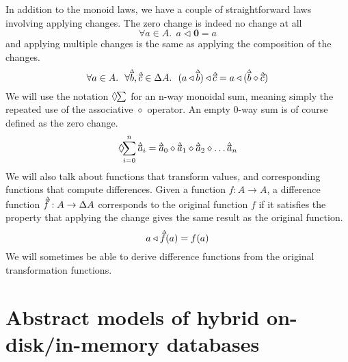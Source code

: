 \documentclass[11pt,a4paper]{article}
\newcommand\deltavar[1]{\accentset{\Delta}{#1}}
\begin{document}
In addition to the monoid laws, we have a couple of straightforward laws involving
applying changes. The zero change is indeed no change at all
\begin{equation}
  \forall a \in A. ~~ a \triangleleft \mathbf{0} = a
\end{equation}
and applying multiple changes is the same as applying the composition of the
changes.
\begin{equation}
\label{eq:apply-compose}
  \forall a \in A. ~~ \forall \deltavar{b}, \deltavar{c} \in \Delta{A}. ~~
    (a \triangleleft \deltavar{b}) \triangleleft \deltavar{c}
  = a \triangleleft (\deltavar{b} \diamond \deltavar{c})
\end{equation}
We will use the notation $\Diamond\hspace{-3pt}\sum$ for an n-way monoidal sum,
meaning simply the repeated use of the associative $\diamond$ operator. An empty
0-way sum is of course defined as the zero change.
\[
\Diamond\hspace{-4pt}\sum_{i=0}^n{\deltavar{a}_i}
= \deltavar{a}_0 \diamond \deltavar{a}_1 \diamond \deltavar{a}_2 \diamond \ldots \deltavar{a}_n
\]
We will also talk about functions that transform values, and corresponding
functions that compute differences. Given a function $f : A \to A$, a
difference function $\deltavar{f} : A \to \Delta{A}$ corresponds to the
original function $f$ if it satisfies the property that applying the change
gives the same result as the original function.
\begin{equation}
  a \triangleleft \deltavar{f}(a) = f(a)
\end{equation}
We will sometimes be able to derive difference functions from the original
transformation functions.


\section{Abstract models of hybrid on-disk/in-memory databases}
\label{abstract-models}
\end{document}

